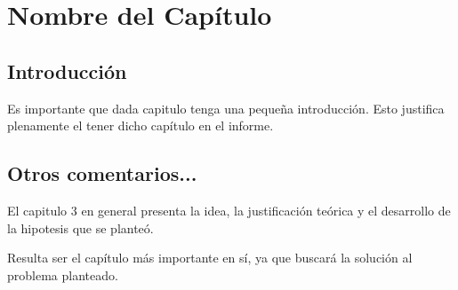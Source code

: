\chapter{Nombre del Capítulo}
\section{Introducción}
Es importante que dada capitulo tenga una pequeña introducción. Esto justifica plenamente el tener dicho capítulo en el informe.

\section{Otros comentarios...}

El capitulo 3 en general presenta la idea, la justificación teórica y el desarrollo de la hipotesis que se planteó.

Resulta ser el capítulo más importante en sí, ya que buscará la solución al problema planteado.